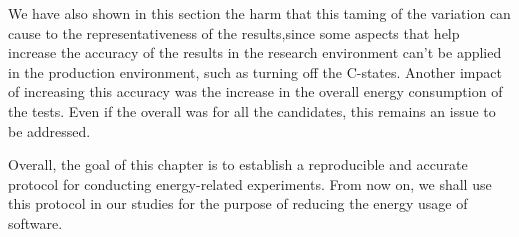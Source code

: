 We have also shown in this section the harm that this taming of the variation can cause to the representativeness of the results,since some aspects that help increase the accuracy of the results in the research environment can't be applied in the production environment, such as turning off the C-states. Another impact of increasing this accuracy was the increase in the overall energy consumption of the tests. Even if the overall was for all the candidates, this remains an issue to be addressed.

Overall, the goal of this chapter is to establish a reproducible and accurate protocol for conducting energy-related experiments. From now on, we shall use this protocol in our studies for the purpose of reducing the energy usage of software.










